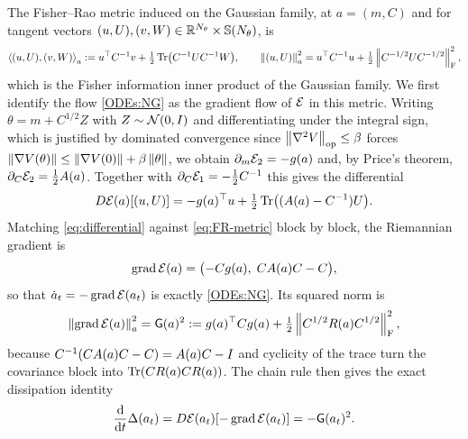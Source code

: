 The Fisher--Rao metric induced on the Gaussian family, at $a=(m,C)$ and for tangent vectors
$(u,U),(v,W)\in\mathbb{R}^{N_\theta}\times\mathbb{S}(N_\theta)$, is
\begin{equation}\label{eq:FR-metric}
    \left\langle (u,U),(v,W)\right\rangle_a
    :=
    u^\top C^{-1}v+\tfrac12\operatorname{Tr}\bigl(C^{-1}UC^{-1}W\bigr),
    \qquad
    \left\lVert (u,U)\right\rVert_a^2
    =
    u^\top C^{-1}u+\tfrac12\left\lVert C^{-1/2}UC^{-1/2}\right\rVert_{\mathrm{F}}^2,
\end{equation}
which is the Fisher information inner product of the Gaussian family. We first identify the
flow \eqref{ODEs:NG} as the gradient flow of $\mathcal{E}$ in this metric. Writing
$\theta=m+C^{1/2}Z$ with $Z\sim\mathcal{N}(0,I)$ and differentiating under the integral sign, which
is justified by dominated convergence since $\left\lVert \nabla^2V\right\rVert_{\mathrm{op}}\leq\beta$ forces
$\left\lVert \nabla V(\theta)\right\rVert\leq\left\lVert \nabla V(0)\right\rVert+\beta\left\lVert \theta\right\rVert$, we obtain
$\partial_m\mathcal{E}_2=-g(a)$ and, by Price's theorem,
$\partial_C\mathcal{E}_2=\tfrac12A(a)$. Together with
$\partial_C\mathcal{E}_1=-\tfrac12C^{-1}$ this gives the differential
\begin{equation}\label{eq:differential}
    D\mathcal{E}(a)[(u,U)]
    =
    -g(a)^\top u+\tfrac12\operatorname{Tr}\bigl((A(a)-C^{-1})U\bigr).
\end{equation}
Matching \eqref{eq:differential} against \eqref{eq:FR-metric} block by block, the Riemannian
gradient is
\begin{equation}\label{eq:FR-gradient}
    \operatorname{grad}\mathcal{E}(a)=\bigl(-Cg(a),\;CA(a)C-C\bigr),
\end{equation}
so that $\dot a_t=-\operatorname{grad}\mathcal{E}(a_t)$ is exactly \eqref{ODEs:NG}. Its squared norm is
\begin{equation}\label{eq:grad-norm}
    \left\lVert \operatorname{grad}\mathcal{E}(a)\right\rVert_a^2
    =
    \mathsf{G}(a)^2
    :=
    g(a)^\top Cg(a)+\tfrac12\left\lVert C^{1/2}R(a)C^{1/2}\right\rVert_{\mathrm{F}}^2,
\end{equation}
because $C^{-1}(CA(a)C-C)=A(a)C-I$ and cyclicity of the trace turn the covariance block
into $\operatorname{Tr}(CR(a)CR(a))$. The chain rule then gives the exact dissipation identity
\begin{equation}\label{eq:dissipation}
    \frac{\mathrm{d}}{\mathrm{d} t}\Delta(a_t)
    =
    D\mathcal{E}(a_t)[-\operatorname{grad}\mathcal{E}(a_t)]
    =
    -\mathsf{G}(a_t)^2 .
\end{equation}

